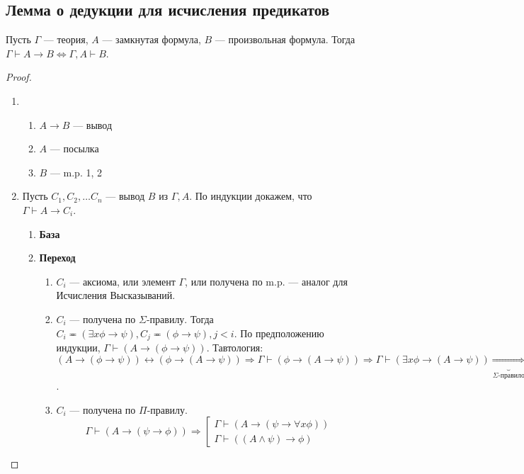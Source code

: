 \subsection{Лемма о дедукции для исчисления предикатов}
\begin{lemma}[О дедукции]
    Пусть $\Gamma$ --- теория, $A$ --- замкнутая формула, $B$ --- произвольная формула. Тогда $\Gamma \vdash A \rightarrow B \Leftrightarrow \Gamma, A \vdash B$.
\end{lemma}
\begin{proof}\indent
    \begin{enumerate}
        \item[$\Rightarrow$.]\begin{enumerate}
                \item[1.] $A \rightarrow B$ --- вывод
                \item[2.] $A$ --- посылка
                \item[3.] $B$ --- m.p. 1, 2
            \end{enumerate}
        \item[$\Leftarrow$.] Пусть $C_1, C_2, \dots C_n$ --- вывод $B$ из $\Gamma, A$. По индукции докажем, что $\Gamma \vdash A \rightarrow C_i$.
        \begin{enumerate}
            \item[] \textbf{База}
            \item[] \textbf{Переход} \begin{enumerate}
                \item $C_i$ --- аксиома, или элемент $\Gamma$, или получена по m.p. --- аналог для Исчисления Высказываний.
                \item $C_i$ --- получена по $\Sigma$-правилу. Тогда $C_i \eqcirc (\exists x \phi \rightarrow \psi), C_j \eqcirc (\phi \rightarrow \psi), j < i$. По предположению индукции, $\Gamma \vdash (A \rightarrow (\phi \rightarrow \psi))$. Тавтология: $(A \rightarrow (\phi \rightarrow \psi)) \leftrightarrow (\phi \rightarrow (A \rightarrow \psi)) \Rightarrow \Gamma \vdash (\phi \rightarrow (A \rightarrow \psi)) \Rightarrow \Gamma \vdash (\exists x \phi \rightarrow (A \rightarrow \psi)) \underbrace{\Longrightarrow}_{\Sigma\text{-правило}} \Gamma \vdash (A \rightarrow ( \exists x \phi \rightarrow \psi)) \Rightarrow \Gamma \vdash (A \rightarrow C_i)$.
                \item $C_i$ --- получена по $\Pi$-правилу.
                $$\Gamma \vdash (A \rightarrow (\psi \rightarrow \phi)) \Rightarrow \left[\begin{array}{l}
                    \Gamma \vdash (A \rightarrow (\psi \rightarrow \forall x \phi))  \\
                    \Gamma \vdash ((A \wedge \psi) \rightarrow \phi) 
                \end{array}\right.$$
            \end{enumerate}
        \end{enumerate}
    \end{enumerate}    
\end{proof}

